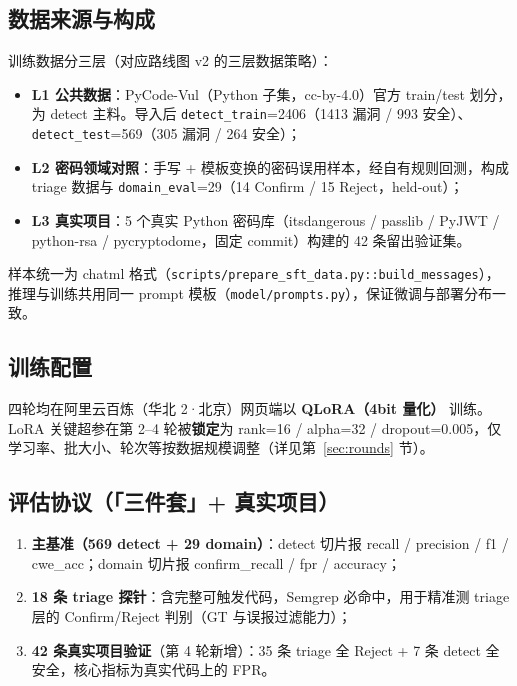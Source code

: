 \documentclass[UTF8,11pt]{ctexart}
\begin{document}
\subsection{数据来源与构成}

训练数据分三层（对应路线图 v2 的三层数据策略）：

\begin{itemize}
  \item \textbf{L1 公共数据}：PyCode-Vul（Python 子集，cc-by-4.0）官方 train/test 划分，为 detect 主料。导入后 \texttt{detect\_train}=2406（1413 漏洞 / 993 安全）、\texttt{detect\_test}=569（305 漏洞 / 264 安全）；
  \item \textbf{L2 密码领域对照}：手写 + 模板变换的密码误用样本，经自有规则回测，构成 triage 数据与 \texttt{domain\_eval}=29（14 Confirm / 15 Reject，held-out）；
  \item \textbf{L3 真实项目}：5 个真实 Python 密码库（itsdangerous / passlib / PyJWT / python-rsa / pycryptodome，固定 commit）构建的 42 条留出验证集。
\end{itemize}

样本统一为 chatml 格式（\texttt{scripts/prepare\_sft\_data.py::build\_messages}），推理与训练共用同一 prompt 模板（\texttt{model/prompts.py}），保证微调与部署分布一致。

\subsection{训练配置}

四轮均在阿里云百炼（华北 2·北京）网页端以 \textbf{QLoRA（4bit 量化）} 训练。LoRA 关键超参在第 2--4 轮被\textbf{锁定}为 rank=16 / alpha=32 / dropout=0.005，仅学习率、批大小、轮次等按数据规模调整（详见第~\ref{sec:rounds} 节）。

\subsection{评估协议（「三件套」+ 真实项目）}

\begin{enumerate}
  \item \textbf{主基准（569 detect + 29 domain）}：detect 切片报 recall / precision / f1 / cwe\_acc；domain 切片报 confirm\_recall / fpr / accuracy；
  \item \textbf{18 条 triage 探针}：含完整可触发代码，Semgrep 必命中，用于精准测 triage 层的 Confirm/Reject 判别（GT 与误报过滤能力）；
  \item \textbf{42 条真实项目验证}（第 4 轮新增）：35 条 triage 全 Reject + 7 条 detect 全安全，核心指标为真实代码上的 FPR。
\end{enumerate}
\end{document}
